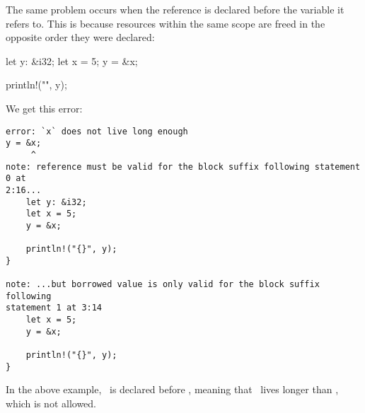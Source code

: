 \blank

The same problem occurs when the reference is declared before the variable it refers to. This is because resources within the same 
scope are freed in the opposite order they were declared:

\begin{rustc}
let y: &i32;
let x = 5;
y = &x;

println!("{}", y);
\end{rustc}

We get this error:

\begin{verbatim}
error: `x` does not live long enough
y = &x;
     ^
note: reference must be valid for the block suffix following statement 0 at
2:16...
    let y: &i32;
    let x = 5;
    y = &x;

    println!("{}", y);
}

note: ...but borrowed value is only valid for the block suffix following
statement 1 at 3:14
    let x = 5;
    y = &x;

    println!("{}", y);
}
\end{verbatim}

In the above example, \y\ is declared before \x, meaning that \y\ lives longer than \x, which is not allowed.
